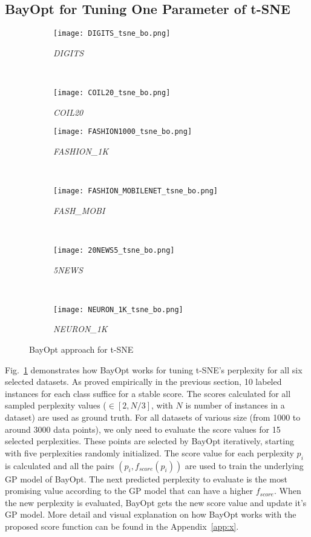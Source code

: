 \subsection{BayOpt for Tuning One Parameter of t-SNE}\label{sec:result:bo:tsne}
\begin{figure}[]%
    \begin{subfigure}[b]{.46\linewidth}
        \centering
        \texttt{[image: DIGITS\_tsne\_bo.png]}
        \caption{\emph{DIGITS}}
    \end{subfigure}
    ~
    \begin{subfigure}[b]{.46\linewidth}
        \centering
        \texttt{[image: COIL20\_tsne\_bo.png]}
        \caption{\emph{COIL20}}
    \end{subfigure}
    \vfill
    \begin{subfigure}[b]{.46\linewidth}
        \centering
        \texttt{[image: FASHION1000\_tsne\_bo.png]}
        \caption{\emph{FASHION\_1K}}
    \end{subfigure}
    ~
    \begin{subfigure}[b]{.46\linewidth}
        \centering
        \texttt{[image: FASHION\_MOBILENET\_tsne\_bo.png]}
        \caption{\emph{FASH\_MOBI}}
    \end{subfigure}
    ~
    \vfill
    \begin{subfigure}[b]{.46\linewidth}
        \centering
        \texttt{[image: 20NEWS5\_tsne\_bo.png]}
        \caption{\emph{5NEWS}}
    \end{subfigure}
    ~
    \begin{subfigure}[b]{.46\linewidth}
        \centering
        \texttt{[image: NEURON\_1K\_tsne\_bo.png]}
        \caption{\emph{NEURON\_1K}}
    \end{subfigure}
    \caption{BayOpt approach for  t-SNE}
    \label{fig:tsne:bo:all}
\end{figure}

Fig.~\ref{fig:tsne:bo:all} demonstrates how BayOpt works for tuning t-SNE's perplexity for all six selected datasets.
As proved empirically in the previous section, 10 labeled instances for each class suffice for a stable score.
The scores calculated for all sampled perplexity values ($\in [2, N/3]$, with $N$ is number of instances in a dataset) are used as ground truth.
For all datasets of various size (from 1000 to around 3000 data points), we only need to evaluate the score values for 15 selected perplexities.
These points are selected by BayOpt iteratively, starting with five perplexities randomly initialized.
The score value for each perplexity $p_i$ is calculated and all the pairs $(p_i, f_{score}(p_i))$ are used to train the underlying GP model of BayOpt.
The next predicted perplexity to evaluate is the most promising value according to the GP model that can have a higher $f_{score}$.
When the new perplexity is evaluated, BayOpt gets the new score value and update it's GP model.
More detail and visual explanation on how BayOpt works with the proposed score function can be found in the Appendix~\ref{app:x}.

